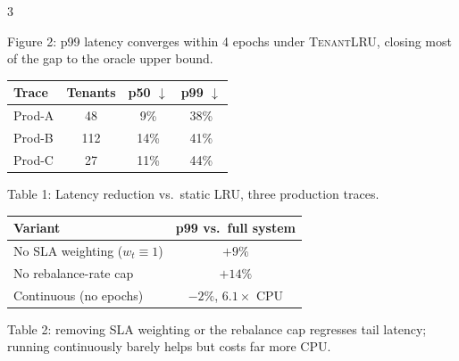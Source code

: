 \documentclass[a0,portrait,final]{sciposter}
\begin{document}
\begin{multicols}{3}
\begin{center}
\end{center}
\begin{center}\footnotesize Figure 2: p99 latency converges within 4 epochs under
\textsc{TenantLRU}, closing most of the gap to the oracle upper bound.\end{center}
\medskip

\begin{center}
\begin{tabular}{lccc}
\toprule
Trace & Tenants & p50 $\downarrow$ & p99 $\downarrow$ \\
\midrule
Prod-A & 48 & 9\% & 38\% \\
Prod-B & 112 & 14\% & 41\% \\
Prod-C & 27 & 11\% & 44\% \\
\bottomrule
\end{tabular}
\end{center}
\begin{center}\footnotesize Table 1: Latency reduction vs.\ static LRU, three production traces.\end{center}
\medskip

\begin{center}
\begin{tabular}{lc}
\toprule
Variant & p99 vs.\ full system \\
\midrule
No SLA weighting ($w_t \equiv 1$) & $+9\%$ \\
No rebalance-rate cap & $+14\%$ \\
Continuous (no epochs) & $-2\%$, $6.1\times$ CPU \\
\bottomrule
\end{tabular}
\end{center}
\begin{center}\footnotesize Table 2: removing SLA weighting or the rebalance cap regresses
tail latency; running continuously barely helps but costs far more CPU.\end{center}
\medskip


\end{multicols}
\end{document}
